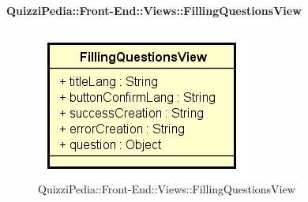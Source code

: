 \paragraph{QuizziPedia::Front-End::Views::FillingQuestionsView}
\begin{figure} [ht]
	\centering
	\includegraphics[scale=0.80]{UML/Classi/Front-End/QuizziPedia_Front-end_Views_FillingQuestionsView.png}
	\caption{QuizziPedia::Front-End::Views::FillingQuestionsView}
\end{figure} \FloatBarrier
